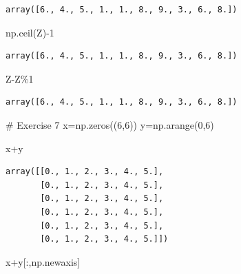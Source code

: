 \documentclass[
  letterpaper,
  DIV=11,
  numbers=noendperiod]{scrreprt}
\newenvironment{Shaded}{\begin{snugshade}}{\end{snugshade}}
\newcommand{\CommentTok}[1]{\textcolor[rgb]{0.37,0.37,0.37}{#1}}
\newcommand{\DecValTok}[1]{\textcolor[rgb]{0.68,0.00,0.00}{#1}}
\newcommand{\NormalTok}[1]{\textcolor[rgb]{0.00,0.23,0.31}{#1}}
\newcommand{\OperatorTok}[1]{\textcolor[rgb]{0.37,0.37,0.37}{#1}}
\begin{document}
\begin{verbatim}
array([6., 4., 5., 1., 1., 8., 9., 3., 6., 8.])
\end{verbatim}

\begin{Shaded}
\begin{Highlighting}[]
\NormalTok{np.ceil(Z)}\OperatorTok{{-}}\DecValTok{1}
\end{Highlighting}
\end{Shaded}

\begin{verbatim}
array([6., 4., 5., 1., 1., 8., 9., 3., 6., 8.])
\end{verbatim}

\begin{Shaded}
\begin{Highlighting}[]
\NormalTok{Z}\OperatorTok{{-}}\NormalTok{Z}\OperatorTok{\%}\DecValTok{1}
\end{Highlighting}
\end{Shaded}

\begin{verbatim}
array([6., 4., 5., 1., 1., 8., 9., 3., 6., 8.])
\end{verbatim}

\begin{Shaded}
\begin{Highlighting}[]
\CommentTok{\# Exercise 7}
\NormalTok{x}\OperatorTok{=}\NormalTok{np.zeros((}\DecValTok{6}\NormalTok{,}\DecValTok{6}\NormalTok{))}
\NormalTok{y}\OperatorTok{=}\NormalTok{np.arange(}\DecValTok{0}\NormalTok{,}\DecValTok{6}\NormalTok{)}
\end{Highlighting}
\end{Shaded}

\begin{Shaded}
\begin{Highlighting}[]
\NormalTok{x}\OperatorTok{+}\NormalTok{y}
\end{Highlighting}
\end{Shaded}

\begin{verbatim}
array([[0., 1., 2., 3., 4., 5.],
       [0., 1., 2., 3., 4., 5.],
       [0., 1., 2., 3., 4., 5.],
       [0., 1., 2., 3., 4., 5.],
       [0., 1., 2., 3., 4., 5.],
       [0., 1., 2., 3., 4., 5.]])
\end{verbatim}

\begin{Shaded}
\begin{Highlighting}[]
\NormalTok{x}\OperatorTok{+}\NormalTok{y[:,np.newaxis]}
\end{Highlighting}
\end{Shaded}
\end{document}
